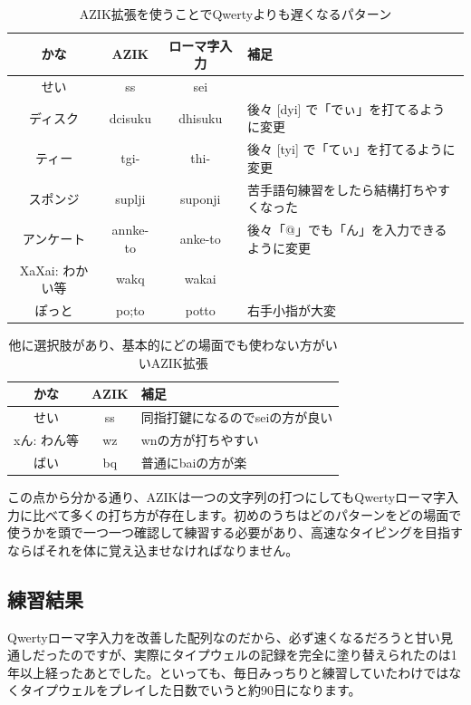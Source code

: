 \begin{table}
\begin{center}
\label{tomoemon:later_azik}
\caption{AZIK拡張を使うことでQwertyよりも遅くなるパターン}
\begin{tabular}{cccl}
\hline
かな & AZIK & ローマ字入力 & 補足 \\
\hline
せい & ss & sei & \\
ディスク & dcisuku & dhisuku & 後々 [dyi] で「でぃ」を打てるように変更 \\
ティー & tgi- & thi- & 後々 [tyi] で「てぃ」を打てるように変更 \\
スポンジ & suplji & suponji & 苦手語句練習をしたら結構打ちやすくなった \\
アンケート & annke-to & anke-to & 後々「@」でも「ん」を入力できるように変更 \\
XaXai: わかい等 & wakq & wakai &  \\
ぽっと & po;to & potto & 右手小指が大変 \\
\hline
\end{tabular}
\end{center}
\end{table}

\begin{table}
\begin{center}
\label{tomoemon:non_azik}
\caption{他に選択肢があり、基本的にどの場面でも使わない方がいいAZIK拡張}
\begin{tabular}{ccl}
\hline
かな & AZIK & 補足 \\
\hline
せい & ss & 同指打鍵になるのでseiの方が良い \\
xん: わん等 & wz & wnの方が打ちやすい \\
ばい & bq & 普通にbaiの方が楽 \\
\hline
\end{tabular}
\end{center}
\end{table}

この点から分かる通り、AZIKは一つの文字列の打つにしてもQwertyローマ字入力に比べて多くの打ち方が存在します。初めのうちはどのパターンをどの場面で使うかを頭で一つ一つ確認して練習する必要があり、高速なタイピングを目指すならばそれを体に覚え込ませなければなりません。

\subsection{練習結果}

Qwertyローマ字入力を改善した配列なのだから、必ず速くなるだろうと甘い見通しだったのですが、実際にタイプウェルの記録を完全に塗り替えられたのは1年以上経ったあとでした。といっても、毎日みっちりと練習していたわけではなくタイプウェルをプレイした日数でいうと約90日になります。

